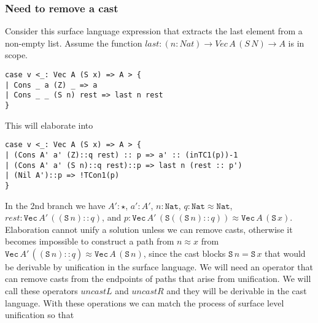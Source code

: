

\subsubsection{Need to remove a cast}

Consider this surface language expression that extracts the last element from a non-empty list.
Assume the function $last:(n:Nat)\rightarrow Vec\,A\,(S\,N)\rightarrow A$ is in scope.

\begin{lstlisting}[basicstyle={\ttfamily\small}]
case v <_: Vec A (S x) => A > {
| Cons _ a (Z) _ => a
| Cons _ _ (S n) rest => last n rest
}
\end{lstlisting}

This will elaborate into 

\begin{lstlisting}[basicstyle={\ttfamily\small}]
case v <_: Vec A (S x) => A > {
| (Cons A' a' (Z)::q rest) :: p => a' :: (inTC1(p))-1
| (Cons A' a' (S n)::q rest)::p => last n (rest :: p')
| (Nil A')::p => !TCon1(p)
}
\end{lstlisting}


In the 2nd branch we have
  $A':\star$, $a':A'$, $n:\mathtt{Nat}$,
  $q:\mathtt{Nat}\approx \mathtt{Nat}$,
  $rest:\mathtt{Vec}\,A'\,\left(\left(\mathtt{S}\,n\right)::q\right)$,
  and $p:\mathtt{Vec}\,A'\,\left(\mathtt{S}\left(\left(\mathtt{S}\,n\right)::q\right)\right)\approx \mathtt{Vec}\,A\,\left(\mathtt{S}\,x\right)$.
Elaboration cannot unify a solution unless we can remove casts, otherwise it becomes impossible to construct a path from $n \approx x$
  from $\mathtt{Vec}\,A'\,\left(\left(\mathtt{S}\,n\right)\underline{::q}\right)\approx \mathtt{Vec}\,A\,\left(\mathtt{S}\,n\right)$, since the cast blocks
  $\mathtt{S}\,n = \mathtt{S}\,x$ that would be derivable by unification in the surface language.
We will need an operator that can remove casts from the endpoints of paths that arise from unification.
We will call these operators $uncastL$ and $uncastR$ and they will be derivable in the cast language.
With these operations we can match the process of surface level unification so that

